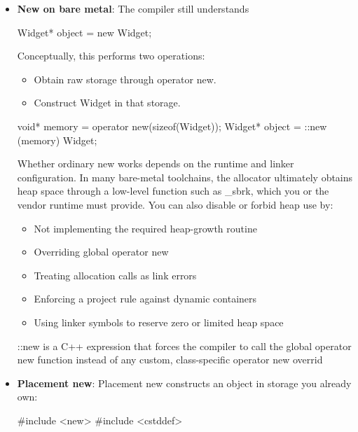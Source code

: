 \documentclass{report}
\begin{document}
\begin{itemize}
\begin{cppcode}
{                    void* allocate(std::size_t bytes);
                };
            \end{cppcode}
            \bigbreak \noindent 
            Individual objects usually are not freed. The complete arena is reset when all objects allocated from it are no longer needed.
        \item \textbf{New on bare metal}: The compiler still understands
            \bigbreak \noindent 
            \begin{cppcode}
                Widget* object = new Widget{};
            \end{cppcode}
            \bigbreak \noindent 
            Conceptually, this performs two operations:
            \begin{itemize}
                \item Obtain raw storage through operator new.
                \item Construct Widget in that storage.
            \end{itemize}
            \bigbreak \noindent 
            \begin{cppcode}
                void* memory = operator new(sizeof(Widget));
                Widget* object = ::new (memory) Widget{};
            \end{cppcode}
            \bigbreak \noindent 
            Whether ordinary new works depends on the runtime and linker configuration. In many bare-metal toolchains, the allocator ultimately obtains heap space through a low-level function such as \_sbrk, which you or the vendor runtime must provide.
            \bigbreak \noindent 
            You can also disable or forbid heap use by:
            \begin{itemize}
                \item Not implementing the required heap-growth routine
                \item Overriding global operator new
                \item Treating allocation calls as link errors
                \item Enforcing a project rule against dynamic containers
                \item Using linker symbols to reserve zero or limited heap space
            \end{itemize}
            ::new is a C++ expression that forces the compiler to call the global operator new function instead of any custom, class-specific operator new overrid
        \item \textbf{Placement new}: Placement new constructs an object in storage you already own:
            \bigbreak \noindent 
            \begin{cppcode}
                #include <new>
                #include <cstddef>


\end{cppcode}
\end{itemize}
\end{document}
